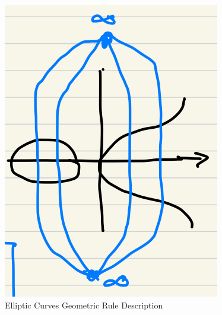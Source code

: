 \documentclass[12pt,titlepage]{article}
\begin{document}
\begin{center}
	\begin{figure}[h!]
		\centering
		\includegraphics[width=.3\textwidth]{Elliptic_Curves_Geometric_Rule.png}
		\caption{Elliptic Curves Geometric Rule Description}
	\end{figure}
\end{center}
\end{document}
